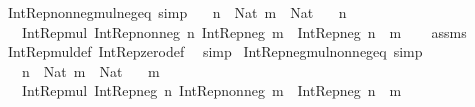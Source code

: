 \begin{isabellebody}
%
\isadelimproof
\isanewline
%
\endisadelimproof
\isanewline
{}\isamarkupfalse%
\ Int{\isacharunderscore}{\kern0pt}Rep{\isacharunderscore}{\kern0pt}nonneg{\isacharunderscore}{\kern0pt}mul{\isacharunderscore}{\kern0pt}neg{\isacharunderscore}{\kern0pt}eq\ {\isacharbrackleft}{\kern0pt}simp{\isacharbrackright}{\kern0pt}{\isacharcolon}{\kern0pt}\isanewline
\ \ \ {\isachardoublequoteopen}n\ {\isacharcolon}{\kern0pt}\ Nat{\isachardoublequoteclose}\ {\isachardoublequoteopen}m\ {\isacharcolon}{\kern0pt}\ Nat{\isachardoublequoteclose}\isanewline
\ \ \ {\isachardoublequoteopen}n\ {\isasymnoteq}\ {}{\isachardoublequoteclose}\isanewline
\ \ \ {\isachardoublequoteopen}Int{\isacharunderscore}{\kern0pt}Rep{\isacharunderscore}{\kern0pt}mul\ {\isacharparenleft}{\kern0pt}Int{\isacharunderscore}{\kern0pt}Rep{\isacharunderscore}{\kern0pt}nonneg\ n{\isacharparenright}{\kern0pt}\ {\isacharparenleft}{\kern0pt}Int{\isacharunderscore}{\kern0pt}Rep{\isacharunderscore}{\kern0pt}neg\ m{\isacharparenright}{\kern0pt}\ {\isacharequal}{\kern0pt}\ Int{\isacharunderscore}{\kern0pt}Rep{\isacharunderscore}{\kern0pt}neg\ {\isacharparenleft}{\kern0pt}n\ {\isacharasterisk}{\kern0pt}\ m{\isacharparenright}{\kern0pt}{\isachardoublequoteclose}\isanewline
%
\isadelimproof
\ \ %
\endisadelimproof
%
\isatagproof
{}\isamarkupfalse%
\ assms\ \isamarkupfalse%
\ Int{\isacharunderscore}{\kern0pt}Rep{\isacharunderscore}{\kern0pt}mul{\isacharunderscore}{\kern0pt}def\ Int{\isacharunderscore}{\kern0pt}Rep{\isacharunderscore}{\kern0pt}zero{\isacharunderscore}{\kern0pt}def\ \isamarkupfalse%
\ simp%
\endisatagproof
{\isafoldproof}%
%
\isadelimproof
\isanewline
%
\endisadelimproof
\isanewline
{}\isamarkupfalse%
\ Int{\isacharunderscore}{\kern0pt}Rep{\isacharunderscore}{\kern0pt}neg{\isacharunderscore}{\kern0pt}mul{\isacharunderscore}{\kern0pt}nonneg{\isacharunderscore}{\kern0pt}eq\ {\isacharbrackleft}{\kern0pt}simp{\isacharbrackright}{\kern0pt}{\isacharcolon}{\kern0pt}\isanewline
\ \ \ {\isachardoublequoteopen}n\ {\isacharcolon}{\kern0pt}\ Nat{\isachardoublequoteclose}\ {\isachardoublequoteopen}m\ {\isacharcolon}{\kern0pt}\ Nat{\isachardoublequoteclose}\isanewline
\ \ \ {\isachardoublequoteopen}m\ {\isasymnoteq}\ {}{\isachardoublequoteclose}\isanewline
\ \ \ {\isachardoublequoteopen}Int{\isacharunderscore}{\kern0pt}Rep{\isacharunderscore}{\kern0pt}mul\ {\isacharparenleft}{\kern0pt}Int{\isacharunderscore}{\kern0pt}Rep{\isacharunderscore}{\kern0pt}neg\ n{\isacharparenright}{\kern0pt}\ {\isacharparenleft}{\kern0pt}Int{\isacharunderscore}{\kern0pt}Rep{\isacharunderscore}{\kern0pt}nonneg\ m{\isacharparenright}{\kern0pt}\ {\isacharequal}{\kern0pt}\ Int{\isacharunderscore}{\kern0pt}Rep{\isacharunderscore}{\kern0pt}neg\ {\isacharparenleft}{\kern0pt}n\ {\isacharasterisk}{\kern0pt}\ m{\isacharparenright}{\kern0pt}{\isachardoublequoteclose}\isanewline

\end{isabellebody}
